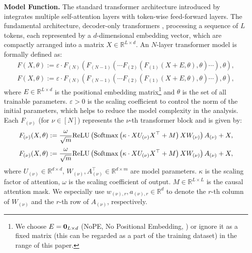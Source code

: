 \documentclass[11pt]{article}
\let\citet\citep
\theoremstyle{plain}
\newcommand{\R}{\mathbb{R}}
\begin{document}
{\bf Model Function. }
The standard transformer architecture introduced by \citet{vsp+17} integrates multiple self-attention layers with token-wise feed-forward layers. The fundamental architecture, decoder-only transformers \citep{rwc+19}, processing a sequence of $ L $ tokens, each represented by a $ d $-dimensional embedding vector, which are compactly arranged into a matrix $ X \in \mathbb{R}^{L \times d} $. An $ N $-layer transformer model is formally defined as:
\ifdefined\isarxiv
\begin{align}\label{eq:F}
F(X, \theta) := \varepsilon \cdot F_{(N)}(F_{(N-1)}( \cdots F_{(2)}(F_{(1)}(X + E, \theta), \theta) \cdots ), \theta),
\end{align}
\else
\begin{align}\label{eq:F}
    F(X, \theta) := \varepsilon \cdot F_{(N)}(F_{(N-1)}( \cdots F_{(2)}(F_{(1)}(X + E, \theta), \theta) \cdots ), \theta),
\end{align}
\fi
where $ E \in \mathbb{R}^{L \times d} $ is the positional embedding matrix\footnote{We choose $E = {\bf 0}_{L \times d}$ (NoPE, No Positional Embedding, \citep{kpn+23}) or ignore it as a fixed matrix (this can be regarded as a part of the training dataset) in the range of this paper. 
} and $\theta$ is the set of all trainable parameters. $\varepsilon > 0$ is the scaling coefficient to control the norm of the initial parameters, which helps to reduce the model complexity in the analysis. Each $ F_{(\nu)} $ (for $ \nu \in [N] $) represents the $ \nu $-th transformer block and is given by:
\ifdefined\isarxiv
\begin{align*}
    F_{(\nu)}(X, \theta)
            :=   \frac{\omega}{\sqrt{m}} {\rm ReLU}\left({\rm Softmax}\left( \kappa \cdot XU_{(\nu)}X^\top + M \right) XW_{(\nu)}\right)A_{(\nu)}  + X ,
\end{align*}
\else
\begin{align*}
    F_{(\nu)}(X, \theta)
            :=   \frac{\omega}{\sqrt{m}} {\rm ReLU}\left({\rm Softmax}\left( \kappa \cdot XU_{(\nu)}X^\top + M \right) XW_{(\nu)}\right)A_{(\nu)}  + X ,
\end{align*}
\fi
where $U_{(\nu)} \in \R^{d \times d}$, $W_{(\nu)}, A_{(\nu)}^\top \in \R^{d \times m}$ are model parameters. $\kappa$ is the scaling factor of attention, $\omega$ is the scaling coefficient of output.
$M \in \R^{L \times L}$ is the causal attention mask. We especially use $w_{(\nu), r}, a_{(\nu), r} \in \R^d$ to denote the $r$-th column of $W_{(\nu)}$ and the $r$-th row of $A_{(\nu)}$, respectively.
\end{document}
